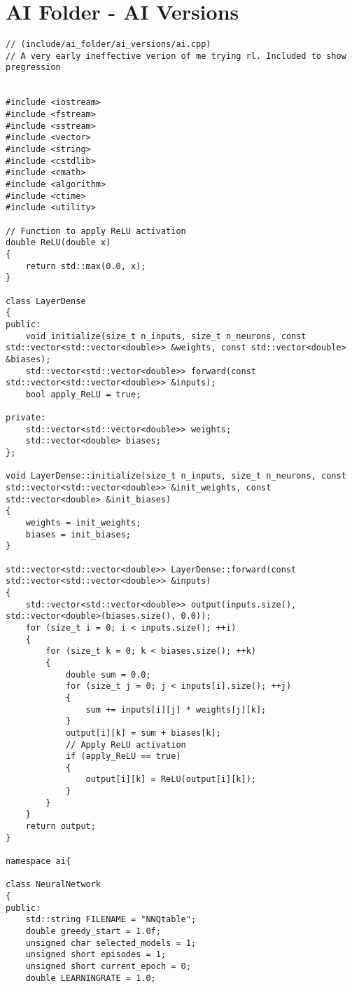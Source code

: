 \section*{AI Folder - AI Versions}
\begin{verbatim}
// (include/ai_folder/ai_versions/ai.cpp)
// A very early ineffective verion of me trying rl. Included to show pregression


#include <iostream>
#include <fstream>
#include <sstream>
#include <vector>
#include <string>
#include <cstdlib>
#include <cmath>
#include <algorithm>
#include <ctime>
#include <utility>

// Function to apply ReLU activation
double ReLU(double x)
{
    return std::max(0.0, x);
}

class LayerDense
{
public:
    void initialize(size_t n_inputs, size_t n_neurons, const std::vector<std::vector<double>> &weights, const std::vector<double> &biases);
    std::vector<std::vector<double>> forward(const std::vector<std::vector<double>> &inputs);
    bool apply_ReLU = true;

private:
    std::vector<std::vector<double>> weights;
    std::vector<double> biases;
};

void LayerDense::initialize(size_t n_inputs, size_t n_neurons, const std::vector<std::vector<double>> &init_weights, const std::vector<double> &init_biases)
{
    weights = init_weights;
    biases = init_biases;
}

std::vector<std::vector<double>> LayerDense::forward(const std::vector<std::vector<double>> &inputs)
{
    std::vector<std::vector<double>> output(inputs.size(), std::vector<double>(biases.size(), 0.0));
    for (size_t i = 0; i < inputs.size(); ++i)
    {
        for (size_t k = 0; k < biases.size(); ++k)
        {
            double sum = 0.0;
            for (size_t j = 0; j < inputs[i].size(); ++j)
            {
                sum += inputs[i][j] * weights[j][k];
            }
            output[i][k] = sum + biases[k];
            // Apply ReLU activation
            if (apply_ReLU == true)
            {
                output[i][k] = ReLU(output[i][k]);
            }
        }
    }
    return output;
}

namespace ai{

class NeuralNetwork
{
public:
    std::string FILENAME = "NNQtable";
    double greedy_start = 1.0f;
    unsigned char selected_models = 1;
    unsigned short episodes = 1;
    unsigned short current_epoch = 0;
    double LEARNINGRATE = 1.0;


\end{verbatim}
